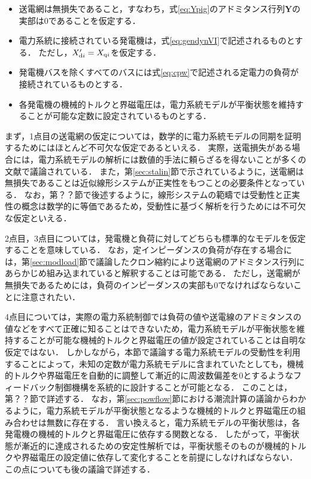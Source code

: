 \documentclass[a4j,10pt,oneside,openany,dvipdfmx]{jsbook}
\begin{document}
\begin{itemize}
\item 送電網は無損失であること，すなわち，式\eqref{eq:Ypig}のアドミタンス行列$\bm{Y}$の実部は0であることを仮定する．
\item 電力系統に接続されている発電機は，式\eqref{eq:gendynVI}で記述されるものとする．
ただし，$X_{{\rm d}i}'=X_{{\rm q}i}$を仮定する．
\item 発電機バスを除くすべてのバスには式\eqref{eq:cpw}で記述される定電力の負荷が接続されているものとする．
\item 各発電機の機械的トルクと界磁電圧は，電力系統モデルが平衡状態を維持することが可能な定数に設定されているものとする．
\end{itemize}
まず，1点目の送電網の仮定については，数学的に電力系統モデルの同期を証明するためにはほとんど不可欠な仮定であるといえる．
実際，送電損失がある場合には，電力系統モデルの解析には数値的手法に頼らざるを得ないことが多くの文献で議論されている\cite{narasimhamurthi1984existence,yang2019distributed}．
また，第\ref{sec:stalin}節で示されているように，送電網は無損失であることは近似線形システムが正実性をもつことの必要条件となっている．
なお，第？？節で後述するように，線形システムの範疇では受動性と正実性の概念は数学的に等価であるため，受動性に基づく解析を行うためには不可欠な仮定といえる．

2点目，3点目については，発電機と負荷に対してどちらも標準的なモデルを仮定することを意味している．
なお，定インピーダンスの負荷が存在する場合には，第\ref{sec:modload}節で議論したクロン縮約により送電網のアドミタンス行列にあらかじめ組み込まれていると解釈することは可能である．
ただし，送電網が無損失であるためには，負荷のインピーダンスの実部も0でなければならないことに注意されたい．

4点目については，実際の電力系統制御では負荷の値や送電線のアドミタンスの値などをすべて正確に知ることはできないため，電力系統モデルが平衡状態を維持することが可能な機械的トルクと界磁電圧の値が設定されていることは自明な仮定ではない．
しかしながら，本節で議論する電力系統モデルの受動性を利用することによって，未知の定数が電力系統モデルに含まれていたとしても，機械的トルクや界磁電圧を自動的に調整して漸近的に周波数偏差を0とするようなフィードバック制御機構を系統的に設計することが可能となる．
このことは，第？？節で詳述する．
なお，第\ref{sec:powflow}節における潮流計算の議論からわかるように，電力系統モデルが平衡状態となるような機械的トルクと界磁電圧の組み合わせは無数に存在する．
言い換えると，電力系統モデルの平衡状態は，各発電機の機械的トルクと界磁電圧に依存する関数となる．
したがって，平衡状態が漸近的に達成されるための安定性解析では，平衡状態そのものが機械的トルクや界磁電圧の設定値に依存して変化することを前提にしなければならない．
この点についても後の議論で詳述する．
\end{document}
